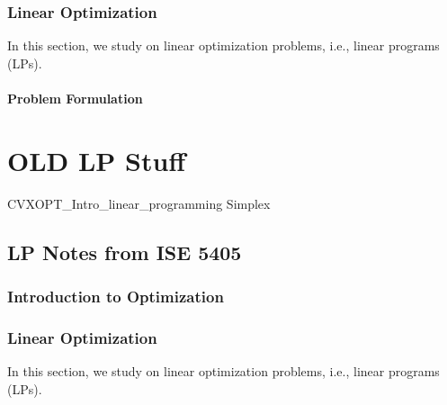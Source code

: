 \documentclass[letter,12pt]{book}
\renewcommand{\0}{\mathbf{0}}
\begin{document}
\tableofcontents
\listoftodos

 \section{Linear Optimization}
In this section, we study on linear optimization problems, i.e., linear programs (LPs).
\subsection{Problem Formulation} 


\part{OLD LP Stuff}

{CVXOPT_Intro_linear_programming}
{Simplex}








%
%
%





%


\chapter{LP Notes from ISE 5405}
\section{Introduction to Optimization}


\newpage \section{Linear Optimization}
In this section, we study on linear optimization problems, i.e., linear programs (LPs).
\end{document}
